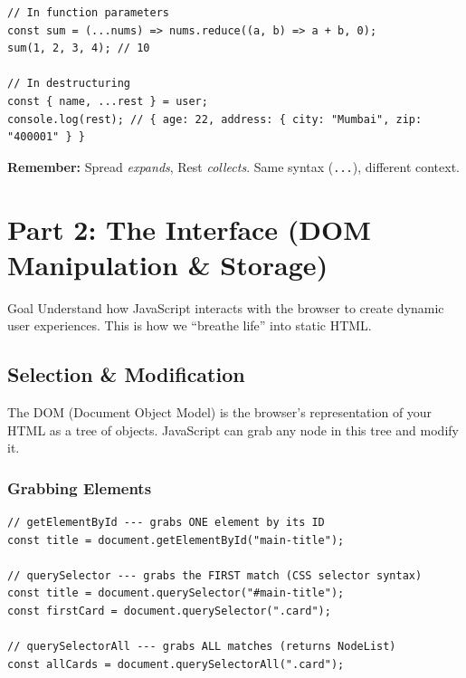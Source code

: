 \documentclass[12pt]{article}
\begin{document}
\begin{lstlisting}
// In function parameters
const sum = (...nums) => nums.reduce((a, b) => a + b, 0);
sum(1, 2, 3, 4); // 10

// In destructuring
const { name, ...rest } = user;
console.log(rest); // { age: 22, address: { city: "Mumbai", zip: "400001" } }
\end{lstlisting}

\textbf{Remember:} Spread \textit{expands}, Rest \textit{collects}. Same syntax (\texttt{...}), different context.

\newpage

\section{Part 2: The Interface (DOM Manipulation \& Storage)}

\begin{conceptbox}{Goal}
Understand how JavaScript interacts with the browser to create dynamic user experiences. This is how we ``breathe life'' into static HTML.
\end{conceptbox}

\subsection{Selection \& Modification}

The DOM (Document Object Model) is the browser's representation of your HTML as a tree of objects. JavaScript can grab any node in this tree and modify it.

\subsubsection*{Grabbing Elements}

\begin{lstlisting}
// getElementById --- grabs ONE element by its ID
const title = document.getElementById("main-title");

// querySelector --- grabs the FIRST match (CSS selector syntax)
const title = document.querySelector("#main-title");
const firstCard = document.querySelector(".card");

// querySelectorAll --- grabs ALL matches (returns NodeList)
const allCards = document.querySelectorAll(".card");
\end{lstlisting}
\end{document}
